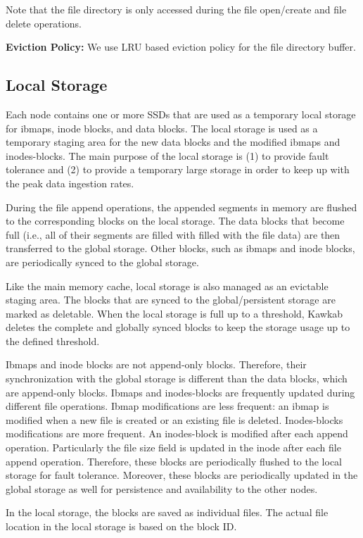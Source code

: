 \documentclass[]{article}
\newcommand{\subtopic}[1]{\vspace{1.5pt} \noindent \textbf{#1}}
\begin{document}
Note that the file directory is only accessed during the file open/create and
file delete operations.

\subtopic{Eviction Policy:} We use LRU based eviction policy for the
file directory buffer.


\subsection{Local Storage} Each node contains one or more SSDs that are used as
a temporary local storage for ibmaps, inode blocks, and data blocks.  The local
storage is used as a temporary staging area for the new data blocks and the
modified ibmaps and inodes-blocks.  The main purpose of the local storage is
(1) to provide fault tolerance and (2) to provide a temporary large storage in
order to keep up with the peak data ingestion rates.

During the file append operations, the appended segments in memory are flushed
to the corresponding blocks on the local storage.  The data blocks that become
full (i.e., all of their segments are filled with filled with the file data)
are then transferred to the global storage.  Other blocks, such as ibmaps and
inode blocks, are periodically synced to the global storage.

Like the main memory cache, local storage is also managed as an evictable
staging area. The blocks that are synced to the global/persistent storage are
marked as deletable. When the local storage is full up to a threshold, Kawkab
deletes the complete and globally synced blocks to keep the storage usage up to
the defined threshold.

Ibmaps and inode blocks are not append-only blocks. Therefore, their
synchronization with the global storage is different than the data blocks,
which are append-only blocks. Ibmaps and inodes-blocks are frequently updated
during different file operations. Ibmap modifications are less frequent: an
ibmap is modified when a new file is created or an existing file is deleted.
Inodes-blocks modifications are more frequent. An inodes-block is modified
after each append operation. Particularly the file size field is updated in the
inode after each file append operation.  Therefore, these blocks are
periodically flushed to the local storage for fault tolerance.  Moreover, these
blocks are periodically updated in the global storage as well for persistence
and availability to the other nodes.

In the local storage, the blocks are saved as individual files. The actual
file location in the local storage is based on the block ID.
\end{document}
